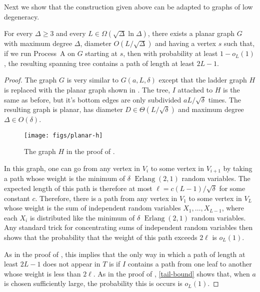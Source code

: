 \documentclass[lotsofwhite]{patmorin}
\DeclareMathOperator{\erlang}{Erlang}
\begin{document}
Next we show that the construction given above can be adapted to graphs
of low degeneracy.

\begin{thm}
  For every $\Delta\ge 3$ and every $L\in\Omega(\sqrt{\Delta}\ln\Delta)$,
  there exists a planar graph $G$ with maximum degree $\Delta$, diameter
  $O(L/\sqrt{\Delta})$ and having a vertex $s$ such that, if we run
  Process~A on $G$ starting at $s$, then with probability at least
  $1-o_L(1)$, the resulting spanning tree contains a path of length at
  least $2L-1$.
\end{thm}

\begin{proof}
  The graph $G$ is very similar to $G(a, L,\delta)$ except that the ladder
  graph $H$ is replaced with the planar graph shown in .
  The tree, $I$ attached to $H$ is the same as before, but it's bottom
  edges are only subdivided $aL/\sqrt{\delta}$ times.  The resulting
  graph is planar, has diameter $D\in\Theta(L/\sqrt{\delta})$ and maximum
  degree $\Delta\in O(\delta)$.

  \begin{figure}
    \begin{center}
      \texttt{[image: figs/planar-h]}
    \end{center}
    \caption{The graph $H$ in the proof of .}
  \end{figure}
 
  In this graph, one can go from any vertex in $V_i$ to some vertex in 
  $V_{i+1}$ by taking a path
  whose weight is the minimum of $\delta$ $\erlang(2,1)$ random
  variables.  The expected length of this path is therefore at most
  $\ell=c(L-1)/\sqrt{\delta}$ for some constant $c$. Therefore, there is
  a path from any vertex in $V_1$ to some vertex in $V_L$ whose weight is
  the sum of independent random variables $X_1,\ldots,X_{L-1}$, where each
  $X_i$ is distributed like the minimum of $\delta$ $\erlang(2,1)$ random
  variables. Any standard trick for concentrating sums of independent
  random variables then shows that the probability that the weight of
  this path exceeds $2\ell$ is $o_L(1)$.

  As in the proof of , this implies
  that the only way in which a path of length at least $2L-1$ does not
  appear in $T$ is if $I$ contains a path from one leaf to another whose
  weight is less than $2\ell$.  As in the proof of ,
  \eqref{tail-bound} shows that, when $a$ is chosen sufficiently large,
  the probability this is occurs is $o_L(1)$.
\end{proof}
\end{document}
